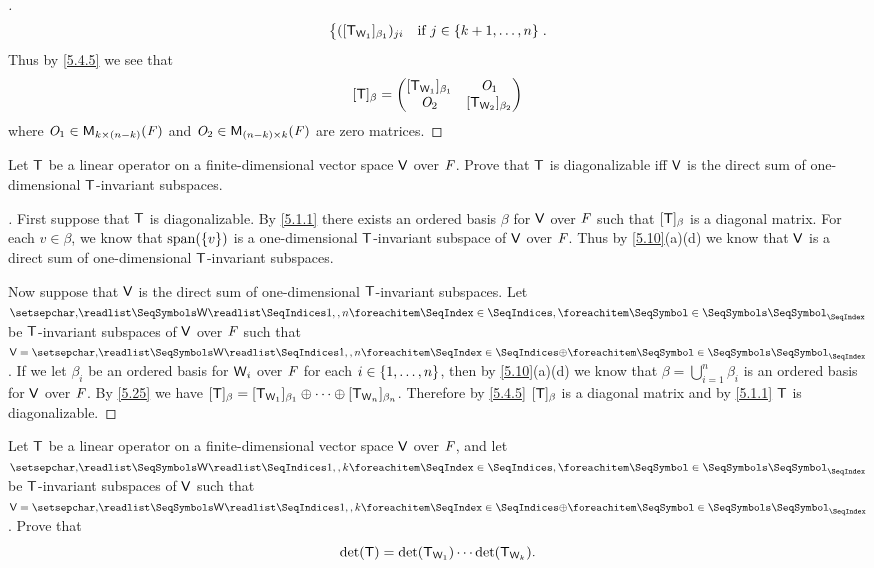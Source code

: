 \begin{proof}[]
\begin{align*}
\begin{dcases}
			                                  ([\mathsf{T}_{\mathsf{W}_1}]_{\beta_1})_{j i} & \text{if } j \in \left\lbrace k + 1, \dots, n\right\rbrace
		                                  \end{dcases}.
	\end{align*}
	Thus by \cref{5.4.5} we see that
	\[
		[\mathsf{T}]_{\beta} = \begin{pmatrix}
			[\mathsf{T}_{\mathsf{W}_1}]_{\beta_1} & \mathit{O}_1                 \\
			\mathit{O}_2                 & [\mathsf{T}_{\mathsf{W}_2}]_{\beta_2}
		\end{pmatrix}
	\]
	where \(\mathit{O}_1 \in \mathsf{M}_{{k} \times (n - k)}({\mathit{F}})\) and \(\mathit{O}_2 \in \mathsf{M}_{{(n - k)} \times k}({\mathit{F}})\) are zero matrices.
\end{proof}

\setcounter{ex}{35}
\begin{ex}\label{ex:5.4.36}
	Let \(\mathsf{T}\) be a linear operator on a finite-dimensional vector space \(\mathsf{V}\) over \(\mathit{F}\).
	Prove that \(\mathsf{T}\) is diagonalizable iff \(\mathsf{V}\) is the direct sum of one-dimensional \(\mathsf{T}\)-invariant subspaces.
\end{ex}

\begin{proof}[]
	First suppose that \(\mathsf{T}\) is diagonalizable.
	By \cref{5.1.1} there exists an ordered basis \(\beta\) for \(\mathsf{V}\) over \(\mathit{F}\) such that \([\mathsf{T}]_{\beta}\) is a diagonal matrix.
	For each \(v \in \beta\), we know that \(\spn{\set{v}}\) is a one-dimensional \(\mathsf{T}\)-invariant subspace of \(\mathsf{V}\) over \(\mathit{F}\).
	Thus by \cref{5.10}(a)(d) we know that \(\mathsf{V}\) is a direct sum of one-dimensional \(\mathsf{T}\)-invariant subspaces.

	Now suppose that \(\mathsf{V}\) is the direct sum of one-dimensional \(\mathsf{T}\)-invariant subspaces.
	Let \(\seq{\W}{1,,n}\) be \(\mathsf{T}\)-invariant subspaces of \(\mathsf{V}\) over \(\mathit{F}\) such that \(\V = \seq[\oplus]{\W}{1,,n}\).
	If we let \(\beta_i\) be an ordered basis for \(\mathsf{W}_i\) over \(\mathit{F}\) for each \(i \in \left\lbrace1, \dots, n\right\rbrace\), then by \cref{5.10}(a)(d) we know that \(\beta = \bigcup_{i = 1}^n \beta_i\) is an ordered basis for \(\mathsf{V}\) over \(\mathit{F}\).
	By \cref{5.25} we have \([\mathsf{T}]_{\beta} = [\mathsf{T}_{\mathsf{W}_1}]_{\beta_1} \oplus \cdots \oplus [\mathsf{T}_{\mathsf{W}_n}]_{\beta_n}\).
	Therefore by \cref{5.4.5} \([\mathsf{T}]_{\beta}\) is a diagonal matrix and by \cref{5.1.1} \(\mathsf{T}\) is diagonalizable.
\end{proof}

\begin{ex}\label{ex:5.4.37}
	Let \(\mathsf{T}\) be a linear operator on a finite-dimensional vector space \(\mathsf{V}\) over \(\mathit{F}\), and let \(\seq{\W}{1,,k}\) be \(\mathsf{T}\)-invariant subspaces of \(\mathsf{V}\) such that \(\V = \seq[\oplus]{\W}{1,,k}\).
	Prove that
	\[
		\det(\mathsf{T}) = \det(\mathsf{T}_{\mathsf{W}_1}) \cdots \det(\mathsf{T}_{\mathsf{W}_k}).
	\]
\end{ex}

